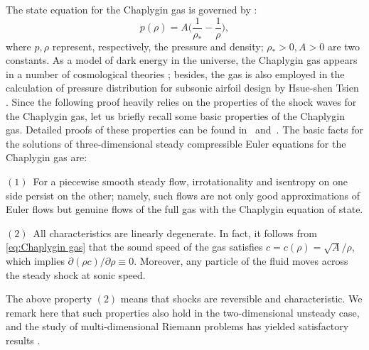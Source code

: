 \documentclass[reqno,12pt]{amsart}
\numberwithin{equation}{section}
\begin{document}
The state equation for the Chaplygin gas is governed by \cite{Chap04}:
    \begin{equation}\label{eq:Chaplygin gas}
	  p(\rho)=A\Big(\frac{1}{\rho_{*}}-\frac{1}{\rho}\Big),
    \end{equation}
where $p, \rho$ represent, respectively, the pressure and density; $\rho_{*}>0, A>0$ are two constants. As a model of dark energy in the universe, the Chaplygin gas appears in a number of cosmological theories \cite{KMP01,Popov10}; besides, the gas is also employed in the calculation of pressure distribution for subsonic airfoil design by Hsue-shen Tsien \cite{T1939}. Since the following proof heavily relies on the properties of the shock waves for the Chaplygin gas, let us briefly recall some basic properties of the Chaplygin gas. Detailed proofs of these properties can be found in \mbox{\cite[Section 2]{Serre09} and \cite[Appendix A.1]{Serre11}}. The basic facts for the solutions of three-dimensional steady compressible Euler equations for the Chaplygin gas are:

\mbox{$(1)$~}For a piecewise smooth steady flow, irrotationality and isentropy on one side persist on the other; namely, such flows are not only good approximations of Euler flows but genuine flows of the full gas with the Chaplygin equation of state.

\mbox{$(2)$~}All characteristics are linearly degenerate. In fact, it follows from \mbox{\eqref{eq:Chaplygin gas}} that the sound speed of the gas satisfies \mbox{$c=c(\rho)=\sqrt{A}/\rho$}, which implies \mbox{${\partial(\rho c)}/{\partial\rho}\equiv0$}. Moreover, any particle of the fluid moves across the steady shock at sonic speed.

The above property $(2)$ means that shocks are reversible and characteristic. We remark here that such properties also hold in the two-dimensional unsteady case, and the study of multi-dimensional Riemann problems has yielded satisfactory results \cite{CCW22,SL16,Serre09}. 
\end{document}
